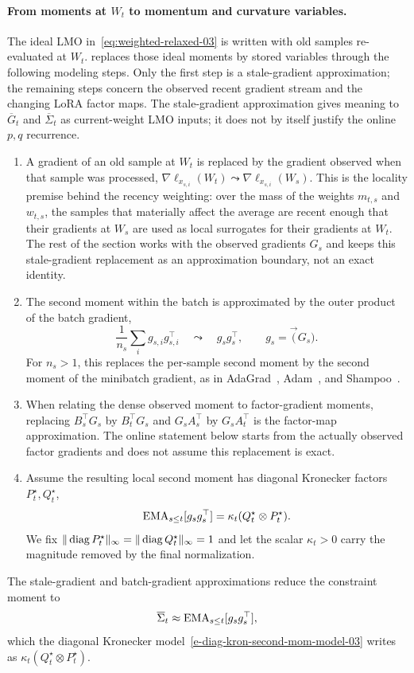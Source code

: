 \paragraph{From moments at $W_t$ to momentum and curvature variables.}
The ideal LMO in~\eqref{eq:weighted-relaxed-03} is written with old samples
re-evaluated at $W_t$.  replaces those ideal moments by stored
variables through the following modeling steps. Only the first step is a
stale-gradient approximation; the remaining steps concern the observed recent
gradient stream and the changing LoRA factor maps. The stale-gradient
approximation gives meaning to $\overline G_t$ and $\overline\Sigma_t$ as
current-weight LMO inputs; it does not by itself justify the online $p,q$
recurrence.
\begin{enumerate}[leftmargin=1.6em,itemsep=2pt,topsep=2pt]
  \item A gradient of an old sample at $W_t$ is replaced by the gradient
  observed when that sample was processed,
  $\nabla\ell_{x_{s,i}}(W_t)\leadsto\nabla\ell_{x_{s,i}}(W_s)$.
  This is the locality premise behind the recency weighting: over the mass of
  the weights $m_{t,s}$ and $w_{t,s}$, the samples that materially affect the
  average are recent enough that their gradients at $W_s$ are used as local
  surrogates for their gradients at $W_t$. The rest of the section works with
  the observed gradients $G_s$ and keeps this stale-gradient replacement as an
  approximation boundary, not an exact identity.
  \item The second moment within the batch is approximated by the outer
  product of the batch gradient,
  \[
    \frac1{n_s}\sum_i g_{s,i}g_{s,i}^\top
    \quad\leadsto\quad
    g_sg_s^\top,
    \qquad g_s=\vec(G_s).
  \]
  For $n_s>1$, this replaces the per-sample second moment by the
  second moment of the minibatch gradient, as in AdaGrad~\cite{adagrad},
  Adam~\cite{adam}, and Shampoo~\cite{shampoo}.
  \item When relating the dense observed moment to factor-gradient moments,
  replacing $B_s^\top G_s$ by $B_t^\top G_s$ and
  $G_sA_s^\top$ by $G_sA_t^\top$ is the factor-map approximation. The online
  statement below starts from the actually observed factor gradients and does
  not assume this replacement is exact.
  \item Assume the resulting local second moment has diagonal Kronecker factors
  $P^\star_t,Q^\star_t$,
  \begin{equation}\label{e-diag-kron-second-mom-model-03}
    \operatorname{EMA}_{s\le t}[g_sg_s^\top]
    =
    \kappa_t(Q^\star_t\otimes P^\star_t).
  \end{equation}
  We fix $\| \operatorname{diag} P^\star_t\|_\infty=\| \operatorname{diag} Q^\star_t\|_\infty=1$ and
  let the scalar $\kappa_t>0$ carry the magnitude removed by the final
  normalization.
\end{enumerate}
The stale-gradient and batch-gradient approximations reduce the constraint
moment to
\[
  \overline\Sigma_t\approx\operatorname{EMA}_{s\le t}[g_sg_s^\top],
\]
which the diagonal Kronecker model~\eqref{e-diag-kron-second-mom-model-03}
writes as $\kappa_t(Q^\star_t\otimes P^\star_t)$.


